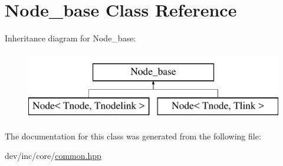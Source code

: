 \hypertarget{classNode__base}{}\section{Node\+\_\+base Class Reference}
\label{classNode__base}
Inheritance diagram for Node\+\_\+base\+:\begin{figure}[H]
\begin{center}
\leavevmode
\includegraphics[height=3.000000cm]{classNode__base}
\end{center}
\end{figure}


The documentation for this class was generated from the following file\+:\begin{DoxyCompactItemize}
\item 
dev/inc/core/\hyperlink{common_8hpp}{common.\+hpp}\end{DoxyCompactItemize}
